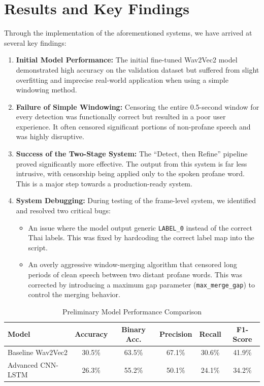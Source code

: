 \documentclass{article}
\begin{document}
\section{Results and Key Findings}

Through the implementation of the aforementioned systems, we have arrived at several key findings:

\begin{enumerate}
    \item \textbf{Initial Model Performance:} The initial fine-tuned Wav2Vec2 model demonstrated high accuracy on the validation dataset but suffered from slight overfitting and imprecise real-world application when using a simple windowing method.
    
    \item \textbf{Failure of Simple Windowing:} Censoring the entire 0.5-second window for every detection was functionally correct but resulted in a poor user experience. It often censored significant portions of non-profane speech and was highly disruptive.
    
    \item \textbf{Success of the Two-Stage System:} The “Detect, then Refine” pipeline proved significantly more effective. The output from this system is far less intrusive, with censorship being applied only to the spoken profane word. This is a major step towards a production-ready system.
    
    \item \textbf{System Debugging:} During testing of the frame-level system, we identified and resolved two critical bugs:
    \begin{itemize}
        \item An issue where the model output generic \texttt{LABEL\_0} instead of the correct Thai labels. This was fixed by hardcoding the correct label map into the script.
        \item An overly aggressive window-merging algorithm that censored long periods of clean speech between two distant profane words. This was corrected by introducing a maximum gap parameter (\texttt{max\_merge\_gap}) to control the merging behavior.
    \end{itemize}
\end{enumerate}

\begin{table}[h!]
\centering
\caption{Preliminary Model Performance Comparison}
\label{tab:model-comparison}
\begin{tabular}{@{}lccccc@{}}
\toprule
Model & Accuracy & Binary Acc. & Precision & Recall & F1-Score \\
\midrule
Baseline Wav2Vec2 & 30.5\% & 63.5\% & 67.1\% & 30.6\% & 41.9\% \\
Advanced CNN-LSTM & 26.3\% & 55.2\% & 50.1\% & 24.1\% & 34.2\% \\
\bottomrule
\end{tabular}
\end{table}
\end{document}
